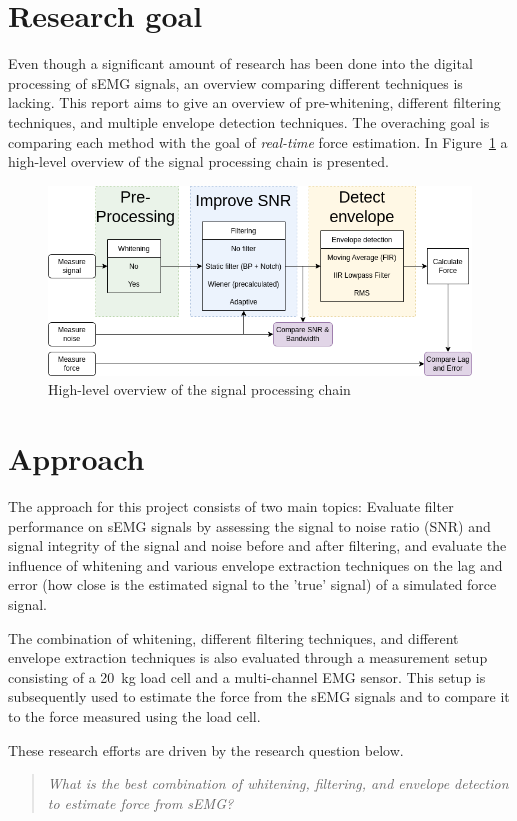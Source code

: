 \section{Research goal}
Even though a significant amount of research has been done into the digital processing of sEMG signals, an overview comparing different techniques is lacking. This report aims to give an overview of pre-whitening, different filtering techniques, and multiple envelope detection techniques. The overaching goal is comparing each method with the goal of \textit{real-time} force estimation. 
In Figure~\ref{fig:global_thesis_flowchart} a high-level overview of the signal processing chain is presented. 

\begin{figure}[h!t]
	\begin{center}
		\includegraphics[width=1.0\columnwidth]{images/global_thesis_flowchart.png}
	\end{center}
	\caption{High-level overview of the signal processing chain}
	\label{fig:global_thesis_flowchart}
\end{figure}


\section{Approach}
The approach for this project consists of two main topics: Evaluate filter performance on sEMG signals by assessing the signal to noise ratio (SNR) and signal integrity of the signal and noise before and after filtering, and evaluate the influence of whitening and various envelope extraction techniques on the lag and error (how close is the estimated signal to the 'true' signal) of a simulated force signal.

The combination of whitening, different filtering techniques, and different envelope extraction techniques is also evaluated through a measurement setup consisting of a \SI{20}{\kilo\gram} load cell and a multi-channel EMG sensor. This setup is subsequently used to estimate the force from the sEMG signals and to compare it to the force measured using the load cell.

These research efforts are driven by the research question below.

\begin{quote}\emph{What is the best combination of whitening, filtering, and envelope detection to estimate force from sEMG? }\end{quote}

